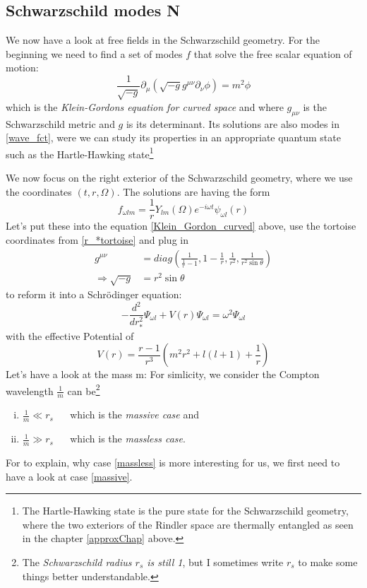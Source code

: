 \subsection{Schwarzschild modes \textbf{N}}
	We now have a look at free fields in the Schwarzschild geometry. For the beginning we need to find a set of modes $f$ that solve the free scalar equation of motion:
		\begin{equation} \label{Klein_Gordon_curved}
			\frac{1}{\sqrt{-g}} \partial_\mu (\sqrt{-g} g^{\mu \nu} \partial_\nu \phi)
			= m^2 \phi
		\end{equation}
	which is the \textit{Klein-Gordons equation for curved space} and where $g_{\mu \nu}$ is the Schwarzschild metric and $g$ is its determinant. Its solutions are also modes in \eqref{wave_fct}, were we can study its properties in an appropriate quantum state such as the Hartle-Hawking state\footnote{The Hartle-Hawking state is the pure state for the Schwarzschild geometry, where the two exteriors of the Rindler space are thermally entangled as seen in the chapter \ref{approxChap} above.}
	
	We now focus on the right exterior of the Schwarzschild geometry, where we use the coordinates $(t,r, \Omega)$. The solutions are having the form
		\begin{equation}
			f_{\omega l m} = 
			\frac{1}{r} Y_{l m}(\Omega) e^{-i \omega t} \psi_{\omega l}(r)
		\end{equation}
	Let's put these into the equation \eqref{Klein_Gordon_curved} above, use the tortoise coordinates from \eqref{r_*tortoise} and plug in
		\begin{align*}
			g^{\mu \nu} &= diag \left(
				\frac{1}{\frac{1}{r}-1},
				1 - \frac{1}{r},
				\frac{1}{r^2},
				\frac{1}{r^2 \sin \theta}
			\right) \\
			\Rightarrow \sqrt{-g}&= r^2 \sin \theta
		\end{align*}
	to reform it into a Schrödinger equation:
		\begin{equation}
			- \frac{d^2}{dr^2_*} \Psi_{\omega l} 
			+ V(r) \Psi_{\omega l} 
			= \omega^2 \Psi_{\omega l}
		\end{equation}
	with the effective Potential of
		\begin{equation}
			V(r)=
			\frac{r-1}{r^3} \left( m^2r^2 + l(l+1) + \frac{1}{r}
			\right)
		\end{equation}
	Let's have a look at the mass m: For simlicity, we consider the Compton wavelength $\frac{1}{m}$ can be\footnote{ The \textit{Schwarzschild radius $r_s$ is still 1}, but I sometimes write $r_s$ to make some things better understandable.} 
		\begin{enumerate}[(i)]
			\item $\frac{1}{m} \ll r_s$	~~ which is the \textit{massive case} and \label{massive}
			\item $\frac{1}{m} \gg r_s$	~~ which is the \textit{massless case}. \label{massless}
		\end{enumerate}
	For to explain, why case \eqref{massless} is more interesting for us, we first need to have a look at case \eqref{massive}.
	

